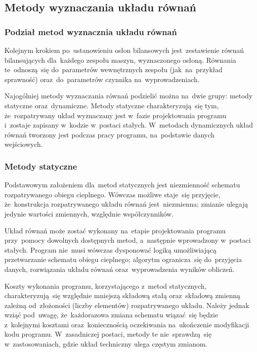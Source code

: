 \subsection{Metody wyznaczania układu równań}

\subsubsection{Podział metod wyznacznia układu równań}

Kolejnym krokiem po~ustanowieniu osłon bilansowych jest~zestawienie
równań bilansujących dla~każdego zespołu maszyn, wyznaczonego osłoną.
Równania te~odnoszą~się do~parametrów wewnętrznych zespołu
(jak~na~przykład sprawność) oraz~do~parametrów czynnika
na~wyprowadzeniach.

Najogólniej metody wyznaczania równań podzielić można na~dwie grupy:
metody statyczne oraz~dynamiczne. Metody statyczne charakteryzują~się
tym, że~rozpatrywany układ wyznaczany jest w~fazie projektowania
programu i~zostaje zapisany w~kodzie w~postaci stałych. W~metodach
dynamicznych układ równań tworzony jest podczas pracy programu,
na~podstawie danych wejściowych.


\subsubsection{Metody statyczne}

Podstawowym założeniem dla~metod statycznych jest niezmienność schematu
rozpatrywanego obiegu cieplnego. Wówczas możliwe staje~się przyjęcie,
że~konstrukcja rozpatrywanego układu równań jest~niezmienna; zmianie
ulegają jedynie wartości zmiennych, względnie współczynników.

Układ równań może zostać wykonany na~etapie projektowania programu
przy~pomocy dowolnych dostępnych metod, a~następnie wprowadzony
w~postaci stałych. Program nie~musi wówczas dysponować logiką
umożliwiającą przetwarzanie schematu obiegu cieplnego; algorytm
ogranicza~się do~przyjęcia danych, rozwiązania układu równań
oraz~wyprowadzenia wyników obliczeń.

Koszty wykonania programu, korzystającego z~metod statycznych,
charakteryzują~się względnie mniejszą składową stałą oraz~składową
zmienną zależną od~złożoności (liczby elementów) rozpatrywanego układu.
Należy jednak wziąć pod~uwagę, że~każdorazowa zmiana schematu wiązać~się
będzie z~kolejnymi kosztami oraz~koniecznością oczekiwania na~ukończenie
modyfikacji kodu programu. W~zasadniczej postaci, metody te
nie~sprawdzą~się w~zastosowaniach, gdzie układ techniczny ulega częstym
zmianom.

